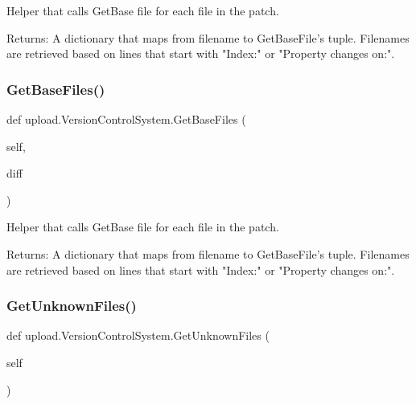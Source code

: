 \begin{DoxyVerb}Helper that calls GetBase file for each file in the patch.

Returns:
  A dictionary that maps from filename to GetBaseFile's tuple.  Filenames
  are retrieved based on lines that start with "Index:" or
  "Property changes on:".
\end{DoxyVerb}
 \mbox{\label{classupload_1_1VersionControlSystem_a812c3b3daf90c88b015fa4b26252e291}} 
\subsubsection{\texorpdfstring{GetBaseFiles()}{GetBaseFiles()}\hspace{0.1cm}{\footnotesize\ttfamily [2/2]}}
{\footnotesize\ttfamily def upload.\+Version\+Control\+System.\+Get\+Base\+Files (\begin{DoxyParamCaption}\item[{}]{self,  }\item[{}]{diff }\end{DoxyParamCaption})}

\begin{DoxyVerb}Helper that calls GetBase file for each file in the patch.

Returns:
  A dictionary that maps from filename to GetBaseFile's tuple.  Filenames
  are retrieved based on lines that start with "Index:" or
  "Property changes on:".
\end{DoxyVerb}
 \mbox{\label{classupload_1_1VersionControlSystem_a56a60e56aa9aff3df4001d2f84cab884}} 
\subsubsection{\texorpdfstring{GetUnknownFiles()}{GetUnknownFiles()}\hspace{0.1cm}{\footnotesize\ttfamily [1/2]}}
{\footnotesize\ttfamily def upload.\+Version\+Control\+System.\+Get\+Unknown\+Files (\begin{DoxyParamCaption}\item[{}]{self }\end{DoxyParamCaption})}

